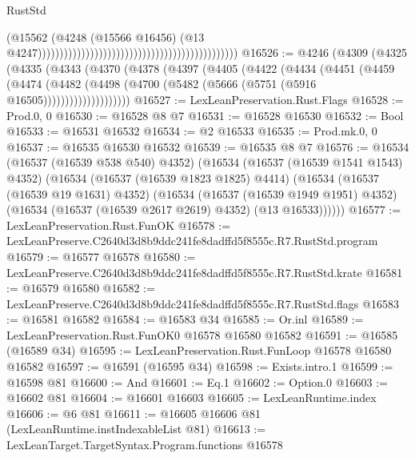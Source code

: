 \begin{lexlean}{RustStd}
\begin{coremodule}
                                                                                          (@15562
                                                                                            (@4248
                                                                                              (@15566
                                                                                                @16456)
                                                                                              (@13
                                                                                                @4247))))))))))))))))))))))))))))))))))))))))))))))
@16526 := @4246
    (@4309
      (@4325
        (@4335
          (@4343
            (@4370
              (@4378
                (@4397
                  (@4405
                    (@4422
                      (@4434
                        (@4451
                          (@4459
                            (@4474
                              (@4482
                                (@4498 (@4700 (@5482 (@5666 (@5751 (@5916 @16505))))))))))))))))))))
@16527 := LexLeanPreservation.Rust.Flags
@16528 := Prod.{0, 0}
@16530 := @16528 @8 @7
@16531 := @16528 @16530
@16532 := Bool
@16533 := @16531 @16532
@16534 := @2 @16533
@16535 := Prod.mk.{0, 0}
@16537 := @16535 @16530 @16532
@16539 := @16535 @8 @7
@16576 := @16534
    (@16537 (@16539 @538 @540) @4352)
    (@16534
      (@16537 (@16539 @1541 @1543) @4352)
      (@16534
        (@16537 (@16539 @1823 @1825) @4414)
        (@16534
          (@16537 (@16539 @19 @1631) @4352)
          (@16534
            (@16537 (@16539 @1949 @1951) @4352)
            (@16534 (@16537 (@16539 @2617 @2619) @4352) (@13 @16533))))))
@16577 := LexLeanPreservation.Rust.FunOK
@16578 := LexLeanPreserve.C2640d3d8b9ddc241fe8dadffd5f8555c.R7.RustStd.program
@16579 := @16577 @16578
@16580 := LexLeanPreserve.C2640d3d8b9ddc241fe8dadffd5f8555c.R7.RustStd.krate
@16581 := @16579 @16580
@16582 := LexLeanPreserve.C2640d3d8b9ddc241fe8dadffd5f8555c.R7.RustStd.flags
@16583 := @16581 @16582
@16584 := @16583 @34
@16585 := Or.inl
@16589 := LexLeanPreservation.Rust.FunOK0 @16578 @16580 @16582
@16591 := @16585 (@16589 @34)
@16595 := LexLeanPreservation.Rust.FunLoop @16578 @16580 @16582
@16597 := @16591 (@16595 @34)
@16598 := Exists.intro.{1}
@16599 := @16598 @81
@16600 := And
@16601 := Eq.{1}
@16602 := Option.{0}
@16603 := @16602 @81
@16604 := @16601 @16603
@16605 := LexLeanRuntime.index
@16606 := @6 @81
@16611 := @16605 @16606 @81 (LexLeanRuntime.instIndexableList @81)
@16613 := LexLeanTarget.TargetSyntax.Program.functions @16578

\end{coremodule}
\end{lexlean}

